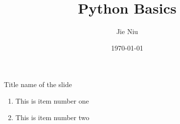 \documentclass{beamer}
\title{Python Basics}
\author{Jie Niu}
\institute{IGWES, JNU}
\date{\today}
\begin{document}
\begin{frame}
\titlepage
\end{frame}

\begin{frame}[t]{Title name of the slide} \vspace{10pt}
\begin{enumerate}
\item This is item number one
\item This is item number two
\end{enumerate}
\end{frame}

\begin{frame}
\end{frame}
\end{document}
